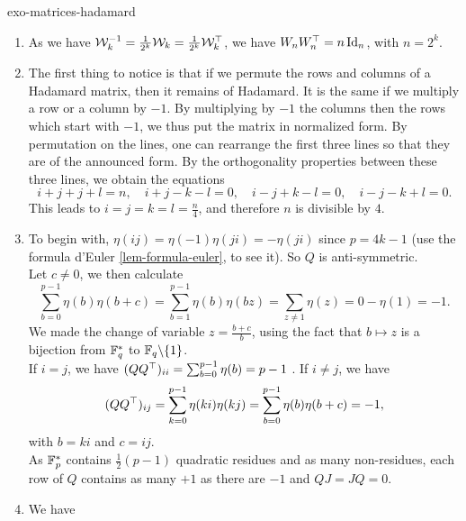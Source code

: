  
\begin{correction}{exo-matrices-hadamard}
\begin{enumerate}
\item As we have $ \mathcal{W}_k^{-1} = \frac{1}{2^k} \mathcal{W}_k = \frac{1}{2^k} \mathcal{W}_k^\top $, we have $ W_n W_n^\top = n \operatorname{Id}_n $, with $ n = 2^k $.
\item The first thing to notice is that if we permute the rows and columns of a Hadamard matrix, then it remains of Hadamard. It is the same if we multiply a row or a column by $ -1 $. By multiplying by $ -1 $ the columns then the rows which start with $ -1 $, we thus put the matrix in normalized form. By permutation on the lines, one can rearrange the first three lines so that they are of the announced form. By the orthogonality properties between these three lines, we obtain the equations
\begin{equation*}
i + j + j + l = n, \quad i + j - k - l = 0, \quad i - j + k - l = 0, \quad i - j - k + l = 0.
\end{equation*}
This leads to $ i = j = k = l = \frac{n}{4} $, and therefore $ n $ is divisible by $ 4 $.
\item {} To begin with, $ \eta (ij) = \eta (-1) \eta (ji) = - \eta (ji) $ since $ p = 4k-1 $ (use the formula d'Euler \ref{lem-formula-euler}, to see it). So $ Q $ is anti-symmetric. \\Let $ c \neq 0 $, we then calculate
\begin{equation*}
\sum_{b = 0}^{p-1}{\eta (b) \eta (b + c)} = \sum_{b = 1}^{p-1}{\eta (b) \eta ( bz)} = \sum_{z \neq 1}{\eta (z)} = 0- \eta (1) = -1.
\end{equation*}
We made the change of variable $ z = \frac{b + c}{b} $, using the fact that $ b \mapsto z $ is a bijection from $ \mathbb{F}_q^* $ to $ \mathbb{F}_q \backslash \{1\} $. \\If $ i = j $, we have $ (Q Q^\top)_{ii} = \sum_{b = 0}^{p-1}{\eta (b)} = p-1 $ . If $ i \neq j $, we have
\begin{equation*}
(Q Q^\top)_{ij} = \sum_{k = 0}^{p-1}{\eta (ki) \eta (kj)} = \sum_{b = 0}^{p- 1}{\eta (b) \eta (b + c)} = -1,
\end{equation*}
with $ b = ki $ and $ c = ij $. \\As $ \mathbb{F}_p^* $ contains $ \frac{1}{2} (p-1) $ quadratic residues and as many non-residues, each row of $ Q $ contains as many $+1 $ as there are $ -1 $ and $ QJ = JQ = 0 $.
\item We have
\begin{equation*}

\end{equation*}
\end{enumerate}
\end{correction}
